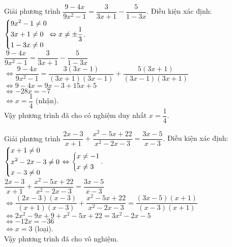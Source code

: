 \begin{vd}%
	Giải phương trình $\dfrac{9-4x}{9x^2-1} = \dfrac{3}{3x+1} - \dfrac{5}{1 - 3x}$.
	\loigiai
	{
		Điều kiện xác định: $\left\{\begin{aligned}& 9x^2 - 1 \neq 0 \\& 3x + 1 \neq 0 \\& 1 - 3x \neq 0\end{aligned}\right. \Leftrightarrow x \neq \pm \dfrac{1}{3}$.\\
		\hspace*{0.6cm} $\dfrac{9-4x}{9x^2-1} = \dfrac{3}{3x+1} - \dfrac{5}{1 - 3x}$\\
		$\Leftrightarrow \dfrac{9-4x}{9x^2-1} = \dfrac{3(3x-1)}{(3x+1)(3x-1)} + \dfrac{5(3x+1)}{(3x-1)(3x+1)}$\\
		$\Leftrightarrow 9 - 4x = 9x - 3 + 15x + 5$\\
		$\Leftrightarrow -28x = -7$\\
		$\Leftrightarrow x = \dfrac{1}{4}$ (nhận).\\
		Vậy phương trình đã cho có nghiệm duy nhất $x = \dfrac{1}{4}$.
	}
\end{vd}


\begin{vd}%
	Giải phương trình $\dfrac{2x-3}{x+1} + \dfrac{x^2-5x+22}{x^2-2x-3} = \dfrac{3x-5}{x-3}$.
	\loigiai
	{
		Điều kiện xác định: $\left\{\begin{aligned}& x + 1 \neq 0 \\& x^2 - 2x - 3 \neq 0 \\& x - 3 \neq 0\end{aligned}\right. \Leftrightarrow \left\{\begin{aligned}& x \neq -1 \\& x \neq 3\end{aligned}\right.$.\\
		\hspace*{0.6cm} $\dfrac{2x-3}{x+1} + \dfrac{x^2-5x+22}{x^2-2x-3} = \dfrac{3x-5}{x-3}$\\
		$\Leftrightarrow \dfrac{(2x-3)(x-3)}{(x+1)(x-3)} + \dfrac{x^2 - 5x + 22}{x^2 - 2x - 3} = \dfrac{(3x-5)(x+1)}{(x-3)(x+1)}$\\
		$\Leftrightarrow 2x^2 - 9x + 9 + x^2 - 5x + 22 = 3x^2 - 2x - 5$\\
		$\Leftrightarrow -12x = -36$\\
		$\Leftrightarrow x = 3$ (loại).\\
		Vậy phương trình đã cho vô nghiệm.
	}
\end{vd}



